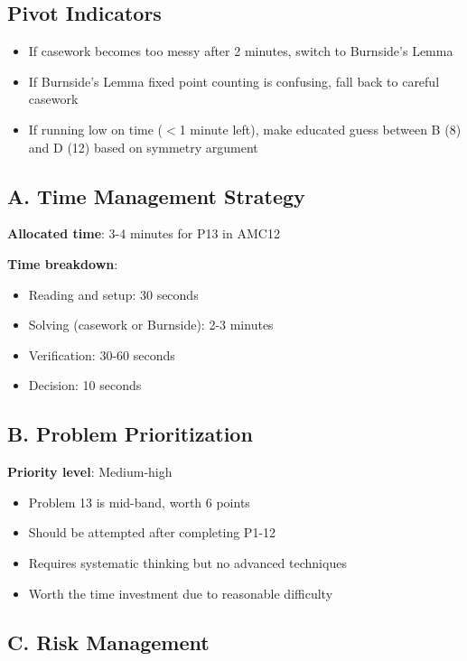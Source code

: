 \documentclass[11pt]{article}
\begin{document}
\begin{solutionbox}
\subsection*{Pivot Indicators}
\begin{itemize}
    \item If casework becomes too messy after 2 minutes, switch to Burnside's Lemma
    \item If Burnside's Lemma fixed point counting is confusing, fall back to careful casework
    \item If running low on time ($<$1 minute left), make educated guess between B (8) and D (12) based on symmetry argument
\end{itemize}
\end{solutionbox}

\begin{competitionbox}
\subsection*{A. Time Management Strategy}

\textbf{Allocated time}: 3-4 minutes for P13 in AMC12

\textbf{Time breakdown}:
\begin{itemize}
    \item Reading and setup: 30 seconds
    \item Solving (casework or Burnside): 2-3 minutes
    \item Verification: 30-60 seconds
    \item Decision: 10 seconds
\end{itemize}

\subsection*{B. Problem Prioritization}

\textbf{Priority level}: Medium-high
\begin{itemize}
    \item Problem 13 is mid-band, worth 6 points
    \item Should be attempted after completing P1-12
    \item Requires systematic thinking but no advanced techniques
    \item Worth the time investment due to reasonable difficulty
\end{itemize}

\subsection*{C. Risk Management}


\end{competitionbox}
\end{document}
